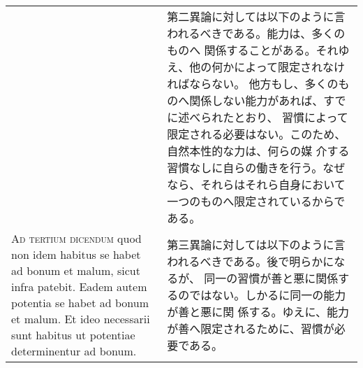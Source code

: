 \documentclass[10pt]{jsarticle} %
\begin{document}
\begin{longtable}{p{21em}p{21em}}
&

第二異論に対しては以下のように言われるべきである。能力は、多くのものへ
関係することがある。それゆえ、他の何かによって限定されなければならない。
他方もし、多くのものへ関係しない能力があれば、すでに述べられたとおり、
習慣によって限定される必要はない。このため、自然本性的な力は、何らの媒
介する習慣なしに自らの働きを行う。なぜなら、それらはそれら自身において
一つのものへ限定されているからである。

\\



{\scshape Ad tertium dicendum} quod non idem habitus se habet ad bonum et malum,
sicut infra patebit. Eadem autem potentia se habet ad bonum et
malum. Et ideo necessarii sunt habitus ut potentiae determinentur ad
bonum.

&

第三異論に対しては以下のように言われるべきである。後で明らかになるが、
同一の習慣が善と悪に関係するのではない。しかるに同一の能力が善と悪に関
係する。ゆえに、能力が善へ限定されるために、習慣が必要である。


\end{longtable}
\end{document}
